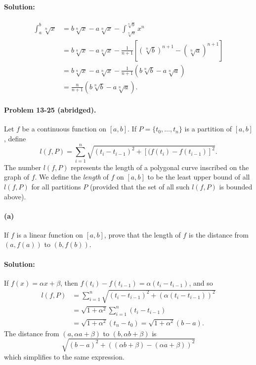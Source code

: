 \documentclass{article}
\begin{document}
\paragraph{Solution:} \begin{align*}
  \int_a^b \sqrt[n]{x}
    &= b\sqrt[n]{x} - a\sqrt[n]{x} - \int_{\sqrt[n]{a}}^{\sqrt[n]{b}} x^n \\
    &= b\sqrt[n]{x} - a\sqrt[n]{x} - \frac{1}{n + 1}[(\sqrt[n]{b})^{n + 1} -
      (\sqrt[n]{a})^{n + 1}] \\
    &= b\sqrt[n]{x} - a\sqrt[n]{x} - \frac{1}{n + 1}(b\sqrt[n]{b} -
      a\sqrt[n]{a}) \\
    &= \frac{n}{n + 1}(b\sqrt[n]{b} - a\sqrt[n]{a}).
\end{align*}

\paragraph{Problem 13-25 (abridged).} Let $f$ be a continuous function on $[a,
b]$. If $P = \{t_0, \ldots, t_n\}$ is a partition of $[a, b]$, define
\begin{equation*}
  l(f, P) = \sum_{i = 1}^n \sqrt{(t_i - t_{i - 1})^2 + [(f(t_i) -
    f(t_{i - 1})]^2}.
\end{equation*} The number $l(f, P)$ represents the length of a polygonal curve
inscribed on the graph of $f$. We define the \emph{length} of $f$ on $[a, b]$
to be the least upper bound of all $l(f, P)$ for all partitions $P$ (provided
that the set of all such $l(f, P)$ is bounded above).

\paragraph{(a)} If $f$ is a linear function on $[a, b]$, prove that the length
of $f$ is the distance from $(a, f(a))$ to $(b, f(b))$.

\paragraph{Solution:} If $f(x) = \alpha x + \beta$, then $f(t_i) - f(t_{i - 1})
= \alpha (t_i - t_{i - 1})$, and so \begin{align*}
  l(f, P) &= \sum_{i = 1}^n \sqrt{(t_i - t_{i - 1})^2 + (\alpha(t_i -
    t_{i - 1}))^2} \\
    &= \sqrt{1 + \alpha^2}\sum_{i = 1}^n (t_i - t_{i - 1}) \\
    &= \sqrt{1 + \alpha^2}(t_n - t_0) = \sqrt{1 + \alpha^2}(b - a).
\end{align*} The distance from $(a, \alpha a + \beta)$ to $(b, \alpha b +
\beta)$ is \begin{equation*}
  \sqrt{(b - a)^2 + ((\alpha b + \beta) - (\alpha a + \beta))^2}
\end{equation*} which simplifies to the same expression.
\end{document}
